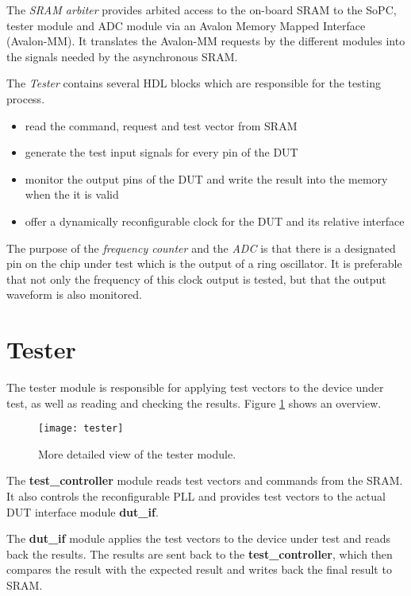 The \textit{SRAM arbiter} provides arbited access to the on-board SRAM to the SoPC, tester module and ADC module via
an Avalon Memory Mapped Interface (Avalon-MM). It translates the Avalon-MM requests by the different modules into
the signals needed by the asynchronous SRAM.

The \textit{Tester} contains several HDL blocks which are responsible for the testing process.
\begin{itemize}
 \item read the command, request and test vector from SRAM
 \item generate the test input signals for every pin of the DUT
 \item monitor the output pins of the DUT and write the result into the memory when the it is valid
 \item offer a dynamically reconfigurable clock for the DUT and its relative interface
\end{itemize}

The purpose of the \textit{frequency counter} and the \textit{ADC} is that there is a designated
pin on the chip under test which is the output of a ring oscillator. It is preferable that not only
the frequency of this clock output is tested, but that the output waveform is also monitored.


\newpage
\section{Tester}
The tester module is responsible for applying test vectors to the device under test, as well as
reading and checking the results. Figure \ref{fig:tester} shows an overview.

\begin{figure}
 \centering
 \texttt{[image: tester]}
 \caption{More detailed view of the tester module.}
 \label{fig:tester}
\end{figure}

The \textbf{test\_controller} module reads test vectors and commands from the SRAM. It also controls
the reconfigurable PLL and provides test vectors to the actual DUT interface module \textbf{dut\_if}.

The \textbf{dut\_if} module applies the test vectors to the device under test and reads back the results.
The results are sent back to the \textbf{test\_controller}, which then compares the result with the
expected result and writes back the final result to SRAM.

